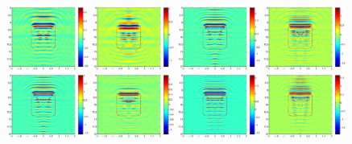 \documentclass[12pt]{iopart}
\begin{document}
\begin{figure}
	\includegraphics[width=0.24\textwidth]{./graphic/rectangle_2pi_impedance_1.eps}
	\includegraphics[width=0.24\textwidth]{./graphic/rectangle_2pi_transmission.eps}
	\includegraphics[width=0.24\textwidth]{./graphic/rectangle_3pi.eps}
	\includegraphics[width=0.24\textwidth]{./graphic/rectangle_3pi_neumann.eps}
	\includegraphics[width=0.24\textwidth]{./graphic/rectangle_3pi_impedance_1.eps}
	\includegraphics[width=0.24\textwidth]{./graphic/rectangle_3pi_transmission.eps}
	\includegraphics[width=0.24\textwidth]{./graphic/rectangle_4pi.eps}
	\includegraphics[width=0.24\textwidth]{./graphic/rectangle_4pi_neumann.eps}

\end{figure}
\end{document}
